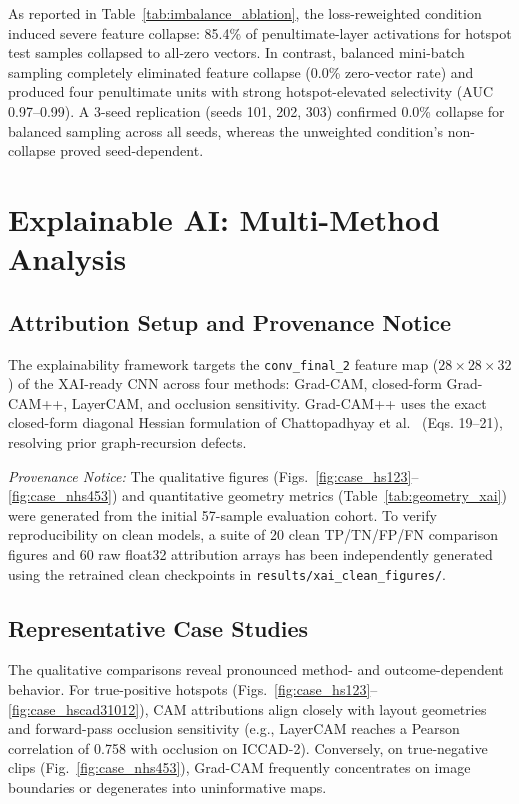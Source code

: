 \documentclass[conference]{IEEEtran}
\begin{document}
As reported in Table~\ref{tab:imbalance_ablation}, the loss-reweighted condition induced severe feature collapse: 85.4\% of penultimate-layer activations for hotspot test samples collapsed to all-zero vectors. In contrast, balanced mini-batch sampling completely eliminated feature collapse (0.0\% zero-vector rate) and produced four penultimate units with strong hotspot-elevated selectivity (AUC 0.97--0.99). A 3-seed replication (seeds 101, 202, 303) confirmed 0.0\% collapse for balanced sampling across all seeds, whereas the unweighted condition's non-collapse proved seed-dependent.

\section{Explainable AI: Multi-Method Analysis}

\subsection{Attribution Setup and Provenance Notice}
The explainability framework targets the \texttt{conv\_final\_2} feature map ($28\times28\times32$) of the XAI-ready CNN across four methods: Grad-CAM, closed-form Grad-CAM++, LayerCAM, and occlusion sensitivity. Grad-CAM++ uses the exact closed-form diagonal Hessian formulation of Chattopadhyay et al.~\cite{chattopadhyay2018} (Eqs. 19--21), resolving prior graph-recursion defects.

\textit{Provenance Notice:} The qualitative figures (Figs.~\ref{fig:case_hs123}--\ref{fig:case_nhs453}) and quantitative geometry metrics (Table~\ref{tab:geometry_xai}) were generated from the initial 57-sample evaluation cohort. To verify reproducibility on clean models, a suite of 20 clean TP/TN/FP/FN comparison figures and 60 raw float32 attribution arrays has been independently generated using the retrained clean checkpoints in \texttt{results/xai\_clean\_figures/}.

\subsection{Representative Case Studies}
The qualitative comparisons reveal pronounced method- and outcome-dependent behavior. For true-positive hotspots (Figs.~\ref{fig:case_hs123}--\ref{fig:case_hscad31012}), CAM attributions align closely with layout geometries and forward-pass occlusion sensitivity (e.g., LayerCAM reaches a Pearson correlation of 0.758 with occlusion on ICCAD-2). Conversely, on true-negative clips (Fig.~\ref{fig:case_nhs453}), Grad-CAM frequently concentrates on image boundaries or degenerates into uninformative maps.
\end{document}
